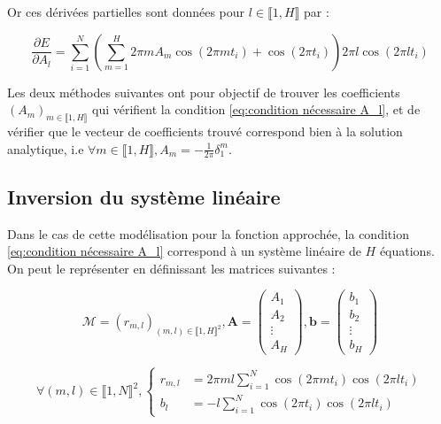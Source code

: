 \documentclass[12pt]{report}
\begin{document}
Or ces dérivées partielles sont données pour $l \in \llbracket 1,H \rrbracket$ par :

\begin{equation}
    \frac{\partial E}{\partial A_l} = 
    \sum_{i=1}^{N}(\sum_{m=1}^{H} 2\pi m A_m \cos(2\pi m t_i)+\cos(2\pi t_i))
    2\pi l \cos(2\pi l t_i)
\label{eq:gradient}
\end{equation}


Les deux méthodes suivantes ont pour objectif de trouver les coefficients $(A_m)_{m\in \llbracket 1,H \rrbracket}$ qui vérifient la condition \ref{eq:condition nécessaire A_l}, et de vérifier que le vecteur de coefficients trouvé correspond bien à la solution analytique, i.e $\forall m \in\llbracket 1,H \rrbracket, A_m = -\frac{1}{2\pi}\delta _1 ^m $.


\subsection{Inversion du système linéaire}

Dans le cas de cette modélisation pour la fonction approchée, la condition \ref{eq:condition nécessaire A_l} correspond à un système linéaire de $H$ équations. 
On peut le représenter en définissant les matrices suivantes :

\begin{equation}
    \mathcal{M} = (r_{m,l})_{(m,l)\in \llbracket 1, H\rrbracket ^2}, 
    \bm{A} = \begin{pmatrix}
                A_1 \\
                A_2 \\
                \vdots \\
                A_H
              \end{pmatrix}, 
    \bm{b} = \begin{pmatrix}
                b_1 \\
                b_2 \\
                \vdots \\
                b_H
              \end{pmatrix}
\label{eq:définition notation}
\end{equation}

\begin{equation}
\forall (m,l) \in \llbracket 1, N\rrbracket ^2,
\left\{
    \begin{aligned}
        r_{m,l} &= 2\pi ml \sum_{i=1}^{N}\cos(2\pi mt_i)\cos(2\pi lt_i) \\
        b_l &= -l\sum_{i=1}^{N}\cos(2\pi t_i)\cos(2\pi lt_i)
    \end{aligned}
\right.
\label{eq:définition coefficients}
\end{equation}
\end{document}
